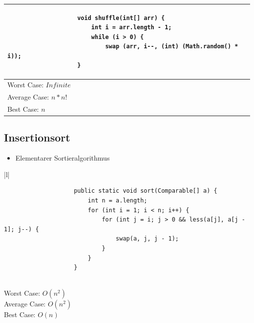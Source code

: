 \documentclass[a4paper, landscape, 8pt]{scrartcl}
\begin{document}
\begin{multicols*}{4}
\begin{tabular}{|l|}
\begin{lstlisting}
                    void shuffle(int[] arr) {
                        int i = arr.length - 1;
                        while (i > 0) {
                            swap (arr, i--, (int) (Math.random() * i));
                    }
                    \end{lstlisting} \\
                    \hline
                    Worst Case: $Infinite$ \\
                    Average Case: $n*n!$ \\
                    Best Case: $n$ \\
                    \hline
                \end{tabular}

            \subsection{Insertionsort}
                \begin{itemize}
                    \item Elementarer Sortieralgorithmus
                \end{itemize}
                \begin{tabular}{|l|}
                    \hline
                    \begin{lstlisting}
                    public static void sort(Comparable[] a) {
                        int n = a.length;
                        for (int i = 1; i < n; i++) {
                            for (int j = i; j > 0 && less(a[j], a[j - 1]; j--) {
                                swap(a, j, j - 1);
                            }
                        }
                    }
                    \end{lstlisting} \\
                    \hline
                    Worst Case: $O(n^2)$ \\
                    Average Case: $O(n^2)$ \\
                    Best Case: $O(n)$ \\
                    \hline
                \end{tabular}

\end{multicols*}
\end{document}
